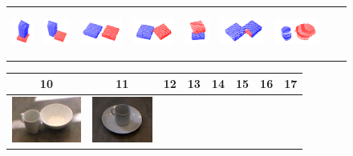 \begin{figure}[h!]
\begin{tabular}{ccccccccc}
    \includegraphics[height=1.5cm]{pictures/33.png}&
    \includegraphics[height=1.5cm]{pictures/43.png}&
    \includegraphics[height=1.5cm]{pictures/53.png}&
    \includegraphics[height=1.5cm]{pictures/63.png}&
    \includegraphics[height=1.5cm]{pictures/73.png}&
    \includegraphics[height=1.5cm]{pictures/83.png}&
    \includegraphics[height=1.5cm]{pictures/93.png}\\
    \end{tabular}
      \hspace*{-3.7cm}  
    \begin{tabular}{cccccccc}
      \hline
      10 & 11 & 12 & 13 & 14 & 15 & 16 & 17\\
      \hline
      \hline
    \includegraphics[height=1.5cm]{pictures/101.jpg}&
    \includegraphics[height=1.5cm]{pictures/111.jpg}&

\end{tabular}
\end{figure}
